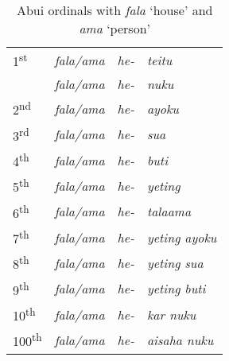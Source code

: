 \begin{table}\centering
\caption{Abui ordinals with \textit{fala} `house' and \textit{ama} `person'}





\begin{tabular}{llll}
1\textsuperscript{st} & \textit{fala/ama} & \textit{he-} & \textit{teitu}\\
 & \textit{fala/ama} & \textit{he-} & \textit{nuku} \\
2\textsuperscript{nd} & \textit{fala/ama} & \textit{he-} & \textit{ayoku}\\
3\textsuperscript{rd} & \textit{fala/ama} & \textit{he-} & \textit{sua}\\
4\textsuperscript{th} & \textit{fala/ama} & \textit{he-} & \textit{buti}\\
5\textsuperscript{th} & \textit{fala/ama} & \textit{he-} & \textit{yeting}\\
6\textsuperscript{th} & \textit{fala/ama} & \textit{he-} & \textit{talaama}\\
7\textsuperscript{th} & \textit{fala/ama} & \textit{he-} & \textit{yeting ayoku}\\
8\textsuperscript{th} & \textit{fala/ama} & \textit{he-} & \textit{yeting sua}\\
9\textsuperscript{th} & \textit{fala/ama} & \textit{he-} & \textit{yeting buti}\\
10\textsuperscript{th} & \textit{fala/ama} & \textit{he-} & \textit{kar nuku}\\
100\textsuperscript{th} & \textit{fala/ama} & \textit{he-} & \textit{aisaha nuku}\\
\end{tabular}

\end{table}

